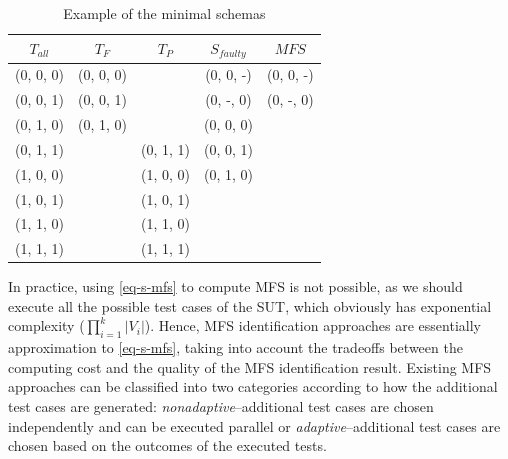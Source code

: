 \documentclass[10pt,journal,cspaper,compsoc]{IEEEtran}
\begin{document}
\begin{table}
\centering
\caption{Example of the minimal schemas}
\label{example_minimal_schemas}
  \begin{tabular}{c| c | c | c | c }
  \hline
  $T_{all}$ & $T_{F}$ & $T_{P}$ & $S_{faulty}$ & $MFS$ \\ \hline
(0, 0, 0) & (0, 0, 0) &           & (0, 0, -) & (0, 0, -)\\
(0, 0, 1) & (0, 0, 1) &           & (0, -, 0) & (0, -, 0)\\
(0, 1, 0) & (0, 1, 0) &           & (0, 0, 0) & \\
(0, 1, 1) &           & (0, 1, 1) & (0, 0, 1) &\\
(1, 0, 0) &           & (1, 0, 0) & (0, 1, 0) &\\
(1, 0, 1) &           & (1, 0, 1) &           &\\
(1, 1, 0) &           & (1, 1, 0) &           &\\
(1, 1, 1) &           & (1, 1, 1) &           &\\\hline
  \end{tabular}
  \end{table}

In practice, using \ref{eq-s-mfs} to compute MFS is not possible, as we should execute all the possible test cases of the SUT, which obviously has exponential complexity ($\prod_{i = 1} ^{k} |V_{i}| $). Hence, MFS identification approaches are essentially approximation to \ref{eq-s-mfs}, taking into account the tradeoffs between the computing cost and the quality of the MFS identification result. Existing MFS approaches can be classified into two categories \cite{colbourn2008locating} according to how the additional test cases are generated: \emph{nonadaptive}--additional test cases are chosen independently and can be executed parallel or \emph{adaptive}--additional test cases are chosen based on the outcomes of the executed tests.
\end{document}
